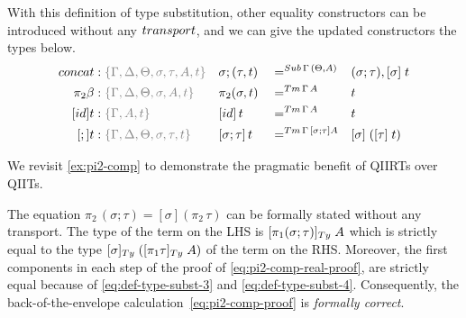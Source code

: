 \documentclass[a4paper,UKenglish,numberwithinsect,cleveref,thm-restate]{lipics-v2021}
\begin{document}
With this definition of type substitution, other equality constructors can be introduced without any $\transp$, and we can give the updated constructors the types below.
\begin{alignat*}{5}
  \mathsf{concat} & : \implicit{\Gamma, \Delta, \Theta, \sigma, \tau, A, t} &&\sigma ; (\tau , t) && =^{\Sub\,\Gamma\,(\Theta, A)} &&  (\sigma ; \tau), [ \sigma ]\;t \\
  \pi_2\beta      & : \implicit{\Gamma, \Delta, \Theta, \sigma, A, t} && \pi_2(\sigma , t)        && =^{\Tm\,\Gamma\, A} &&  t \\
  [\idS]t         & : \implicit{\Gamma, A, t} && {[\idS]\,t}          && =^{\Tm\,\Gamma\,A} && t \\
  [;]t            & : \implicit{\Gamma, \Delta, \Theta, \sigma, \tau, t} && {[\sigma ; \tau]\,t} && =^{\Tm\,\Gamma\,[\sigma ; \tau] A} && {[ \sigma ]\;([ \tau ]\;t})
\end{alignat*}

We revisit \cref{ex:pi2-comp} to demonstrate the pragmatic benefit of QIIRTs over QIITs.
\begin{example} \label{ex:pi-comp-qiirt}
  The equation $\pi_2\,(\sigma; \tau) = [\sigma](\pi_2\,\tau)$ can be formally stated without any transport.
  The type of the term on the LHS is $[\pi_1(\sigma;\tau)]_{\Ty}\;A$ which is strictly equal to the type $[\sigma]_\Ty\;([\pi_1\tau]_\Ty\;A)$ of the term on the RHS.
  Moreover, the first components in each step of the proof of \eqref{eq:pi2-comp-real-proof}, are strictly equal because of \eqref{eq:def-type-subst-3} and \eqref{eq:def-type-subst-4}.
  Consequently, the back-of-the-envelope calculation~\eqref{eq:pi2-comp-proof} is \emph{formally correct}.
\end{example}
\end{document}
